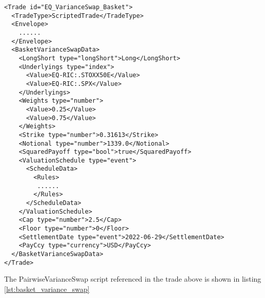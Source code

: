 \begin{verbatim}
<Trade id="EQ_VarianceSwap_Basket">
  <TradeType>ScriptedTrade</TradeType>
  <Envelope>
    ......
  </Envelope>
  <BasketVarianceSwapData>
    <LongShort type="longShort">Long</LongShort>
    <Underlyings type="index">
      <Value>EQ-RIC:.STOXX50E</Value>
      <Value>EQ-RIC:.SPX</Value>
    </Underlyings>
    <Weights type="number">
      <Value>0.25</Value>
      <Value>0.75</Value>
    </Weights>
    <Strike type="number">0.31613</Strike>
    <Notional type="number">1339.0</Notional>
    <SquaredPayoff type="bool">true</SquaredPayoff>
    <ValuationSchedule type="event">
      <ScheduleData>
        <Rules>
         ......
        </Rules>
      </ScheduleData>
    </ValuationSchedule>
    <Cap type="number">2.5</Cap>
    <Floor type="number">0</Floor>
    <SettlementDate type="event">2022-06-29</SettlementDate>
    <PayCcy type="currency">USD</PayCcy>
  </BasketVarianceSwapData>
</Trade>
\end{verbatim}

The PairwiseVarianceSwap script referenced in the trade above is shown in listing
\ref{lst:basket_variance_swap}

